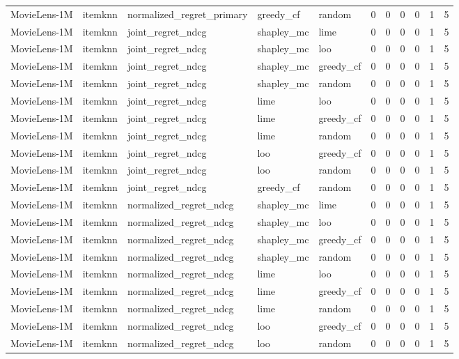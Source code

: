 \begin{table}[t]
{\begin{tabular}{lllllrrrrrr}
MovieLens-1M & itemknn & normalized\_regret\_primary & greedy\_cf & random & 0 & 0 & 0 & 0 & 1 & 5 \\
MovieLens-1M & itemknn & joint\_regret\_ndcg & shapley\_mc & lime & 0 & 0 & 0 & 0 & 1 & 5 \\
MovieLens-1M & itemknn & joint\_regret\_ndcg & shapley\_mc & loo & 0 & 0 & 0 & 0 & 1 & 5 \\
MovieLens-1M & itemknn & joint\_regret\_ndcg & shapley\_mc & greedy\_cf & 0 & 0 & 0 & 0 & 1 & 5 \\
MovieLens-1M & itemknn & joint\_regret\_ndcg & shapley\_mc & random & 0 & 0 & 0 & 0 & 1 & 5 \\
MovieLens-1M & itemknn & joint\_regret\_ndcg & lime & loo & 0 & 0 & 0 & 0 & 1 & 5 \\
MovieLens-1M & itemknn & joint\_regret\_ndcg & lime & greedy\_cf & 0 & 0 & 0 & 0 & 1 & 5 \\
MovieLens-1M & itemknn & joint\_regret\_ndcg & lime & random & 0 & 0 & 0 & 0 & 1 & 5 \\
MovieLens-1M & itemknn & joint\_regret\_ndcg & loo & greedy\_cf & 0 & 0 & 0 & 0 & 1 & 5 \\
MovieLens-1M & itemknn & joint\_regret\_ndcg & loo & random & 0 & 0 & 0 & 0 & 1 & 5 \\
MovieLens-1M & itemknn & joint\_regret\_ndcg & greedy\_cf & random & 0 & 0 & 0 & 0 & 1 & 5 \\
MovieLens-1M & itemknn & normalized\_regret\_ndcg & shapley\_mc & lime & 0 & 0 & 0 & 0 & 1 & 5 \\
MovieLens-1M & itemknn & normalized\_regret\_ndcg & shapley\_mc & loo & 0 & 0 & 0 & 0 & 1 & 5 \\
MovieLens-1M & itemknn & normalized\_regret\_ndcg & shapley\_mc & greedy\_cf & 0 & 0 & 0 & 0 & 1 & 5 \\
MovieLens-1M & itemknn & normalized\_regret\_ndcg & shapley\_mc & random & 0 & 0 & 0 & 0 & 1 & 5 \\
MovieLens-1M & itemknn & normalized\_regret\_ndcg & lime & loo & 0 & 0 & 0 & 0 & 1 & 5 \\
MovieLens-1M & itemknn & normalized\_regret\_ndcg & lime & greedy\_cf & 0 & 0 & 0 & 0 & 1 & 5 \\
MovieLens-1M & itemknn & normalized\_regret\_ndcg & lime & random & 0 & 0 & 0 & 0 & 1 & 5 \\
MovieLens-1M & itemknn & normalized\_regret\_ndcg & loo & greedy\_cf & 0 & 0 & 0 & 0 & 1 & 5 \\
MovieLens-1M & itemknn & normalized\_regret\_ndcg & loo & random & 0 & 0 & 0 & 0 & 1 & 5 \\

\end{tabular}}
\end{table}
